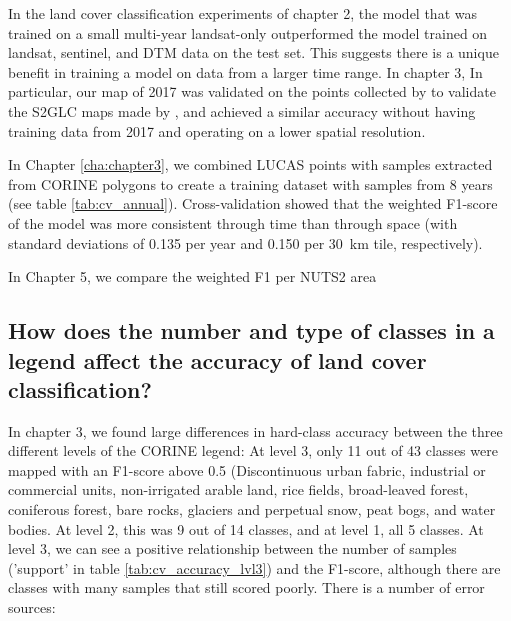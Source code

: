         In the land cover classification experiments of chapter 2, the model that was trained on a small multi-year landsat-only outperformed the model trained on landsat, sentinel, and DTM data on the test set. This suggests there is a unique benefit in training a model on data from a larger time range.
        In chapter 3, 
         In particular, our map of 2017 was validated on the points collected by \citep{jenerowicz2021validation} to validate the S2GLC maps made by \citet{malinowski2020automated}, and achieved a similar accuracy without having training data from 2017 and operating on a lower spatial resolution.
        
        In Chapter \ref{cha:chapter3}, we combined LUCAS points with samples extracted from CORINE polygons to create a training dataset with samples from 8 years (see table \ref{tab:cv_annual}). Cross-validation showed that the weighted F1-score of the model was more consistent through time than through space (with standard deviations of 0.135 per year and 0.150 per 30~km tile, respectively). 

        In Chapter 5, we compare the weighted F1 per NUTS2 area
    
    \subsection{How does the number and type of classes in a legend affect the accuracy of land cover classification?}
    \label{syn:rq3}

        In chapter 3, we found large differences in hard-class accuracy between the three different levels of the CORINE legend: At level 3, only 11 out of 43 classes were mapped with an F1-score above 0.5 (Discontinuous urban fabric, industrial or commercial units, non-irrigated arable land, rice fields, broad-leaved forest, coniferous forest, bare rocks, glaciers and perpetual snow, peat bogs, and water bodies. At level 2, this was 9 out of 14 classes, and at level 1, all 5 classes. At level 3, we can see a positive relationship between the number of samples ('support' in table \ref{tab:cv_accuracy_lvl3}) and the F1-score, although there are classes with many samples that still scored poorly. There is a number of error sources: 

